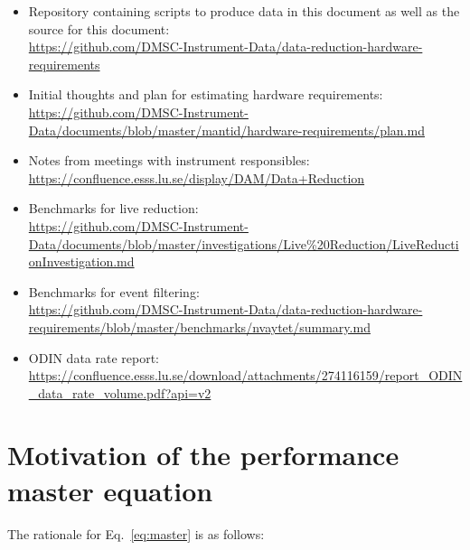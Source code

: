 \documentclass[a4paper,english,numbers=noenddot,bibliography=totoc,chapterprefix=on,DIV=12]{scrartcl}
\newcommand{\odin}{ODIN\xspace}
\begin{document}
\begin{itemize}
  \item Repository containing scripts to produce data in this document as well as the source for this document:\\
    \url{https://github.com/DMSC-Instrument-Data/data-reduction-hardware-requirements}
  \item Initial thoughts and plan for estimating hardware requirements:\\
    \url{https://github.com/DMSC-Instrument-Data/documents/blob/master/mantid/hardware-requirements/plan.md}
  \item Notes from meetings with instrument responsibles:\\
    \url{https://confluence.esss.lu.se/display/DAM/Data+Reduction}
  \item Benchmarks for live reduction:\\
    \url{https://github.com/DMSC-Instrument-Data/documents/blob/master/investigations/Live%20Reduction/LiveReductionInvestigation.md}
  \item Benchmarks for event filtering:\\
    \url{https://github.com/DMSC-Instrument-Data/data-reduction-hardware-requirements/blob/master/benchmarks/nvaytet/summary.md}
  \item \odin data rate report:\\
    \url{https://confluence.esss.lu.se/download/attachments/274116159/report_ODIN_data_rate_volume.pdf?api=v2}
\end{itemize}

\section{Motivation of the performance master equation}
\label{app:master_eq}

The rationale for Eq.~\eqref{eq:master} is as follows:
\end{document}
